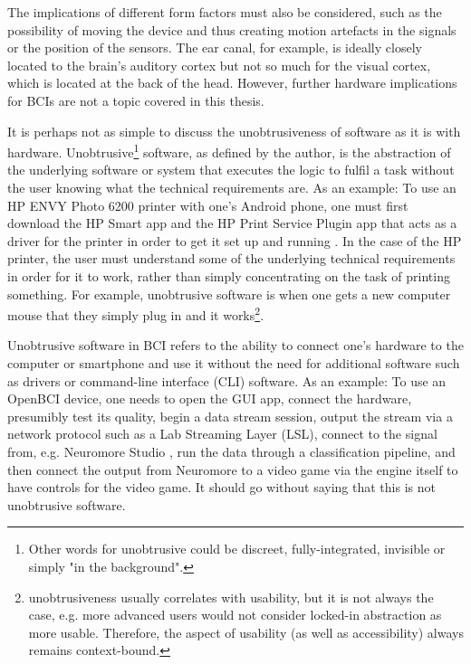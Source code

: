 The implications of different form factors must also be considered, such as the possibility of moving the device and thus creating motion artefacts in the signals or the position of the sensors. The ear canal, for example, is ideally closely located to the brain's auditory cortex but not so much for the visual cortex, which is located at the back of the head. However, further hardware implications for BCIs are not a topic covered in this thesis.

It is perhaps not as simple to discuss the unobtrusiveness of software as it is with hardware. Unobtrusive\footnote{Other words for unobtrusive could be discreet, fully-integrated, invisible or simply "in the background".} software, as defined by the author, is the abstraction of the underlying software or system that executes the logic to fulfil a task without the user knowing what the technical requirements are. As an example: To use an HP ENVY Photo 6200 printer with one's Android phone, one must first download the HP Smart app and the HP Print Service Plugin app that acts as a driver for the printer in order to get it set up and running \citep{hp_hp_nodate}. In the case of the HP printer, the user must understand some of the underlying technical requirements in order for it to work, rather than simply concentrating on the task of printing something. For example, unobtrusive software is when one gets a new computer mouse that they simply plug in and it works\footnote{unobtrusiveness usually correlates with usability, but it is not always the case, e.g. more advanced users would not consider locked-in abstraction as more usable. Therefore, the aspect of usability (as well as accessibility) always remains context-bound.}.

Unobtrusive software in BCI refers to the ability to connect one's hardware to the computer or smartphone and use it without the need for additional software such as drivers or command-line interface (CLI) software. As an example: To use an OpenBCI device, one needs to open the GUI app, connect the hardware, presumibly test its quality, begin a data stream session, output the stream via a network protocol such as a Lab Streaming Layer (LSL), connect to the signal from, e.g. Neuromore Studio \citep{openbci_neuromore_nodate}, run the data through a classification pipeline, and then connect the output from Neuromore to a video game via the engine itself to have controls for the video game. It should go without saying that this is not unobtrusive software.


